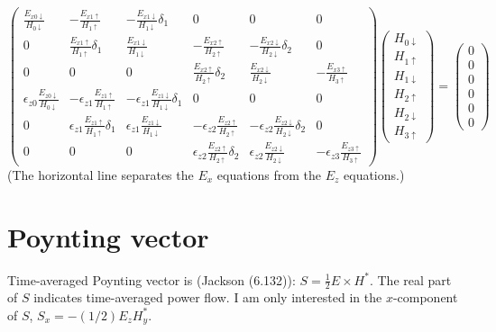 \documentclass[12pt]{article}
\renewcommand{\(}{\left(}
\renewcommand{\)}{\right)}
\newcommand{\e}{\epsilon}
\begin{document}
$$\begin{pmatrix}
\frac{E_{x0\downarrow}}{H_{0\downarrow}} & -\frac{E_{x1\uparrow}}{H_{1\uparrow}} & -\frac{E_{x1\downarrow}}{H_{1\downarrow}} \delta_1 & 0 & 0 & 0 \\
0 & \frac{E_{x1\uparrow}}{H_{1\uparrow}} \delta_1 & \frac{E_{x1\downarrow}}{H_{1\downarrow}} & -\frac{E_{x2\uparrow}}{H_{2\uparrow}} & -\frac{E_{x2\downarrow}}{H_{2\downarrow}} \delta_2 & 0 \\
0 & 0 & 0 & \frac{E_{x2\uparrow}}{H_{2\uparrow}} \delta_2 & \frac{E_{x2\downarrow}}{H_{2\downarrow}} & -\frac{E_{x3\uparrow}}{H_{3\uparrow}} \\ \hline
\e_{z0}\frac{E_{z0\downarrow}}{H_{0\downarrow}} & -\e_{z1}\frac{E_{z1\uparrow}}{H_{1\uparrow}} & -\e_{z1}\frac{E_{z1\downarrow}}{H_{1\downarrow}} \delta_1 & 0 & 0 & 0 \\
0 & \e_{z1} \frac{E_{z1\uparrow}}{H_{1\uparrow}} \delta_1 & \e_{z1} \frac{E_{z1\downarrow}}{H_{1\downarrow}} & -\e_{z2} \frac{E_{z2\uparrow}}{H_{2\uparrow}} & -\e_{z2} \frac{E_{z2\downarrow}}{H_{2\downarrow}} \delta_2 & 0 \\
0 & 0 & 0 & \e_{z2} \frac{E_{z2\uparrow}}{H_{2\uparrow}} \delta_2 & \e_{z2} \frac{E_{z2\downarrow}}{H_{2\downarrow}} & -\e_{z3} \frac{E_{z3\uparrow}}{H_{3\uparrow}}
\end{pmatrix}
\begin{pmatrix} H_{0\downarrow} \\ H_{1\uparrow} \\ H_{1\downarrow} \\ H_{2\uparrow} \\ H_{2\downarrow} \\ H_{3\uparrow} \end{pmatrix} = \begin{pmatrix} 0 \\ 0 \\ 0 \\ 0 \\ 0 \\ 0 \end{pmatrix}$$
(The horizontal line separates the $E_x$ equations from the $E_z$ equations.)


\section{Poynting vector}

Time-averaged Poynting vector is (Jackson (6.132)): $S = \frac12 E \times H^*$. The real part of $S$ indicates time-averaged power flow. I am only interested in the $x$-component of $S$, $S_x = -(1/2)E_z H_y^*$.
\end{document}
